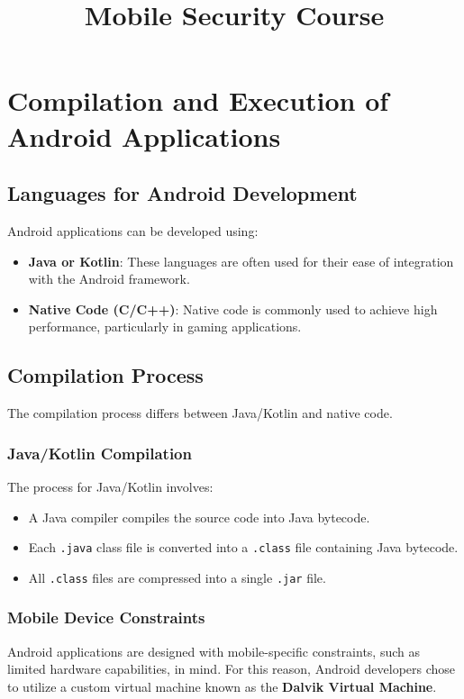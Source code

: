 \documentclass{article}
\title{Mobile Security Course}
\author{}
\date{}
\begin{document}
\maketitle

\section{Compilation and Execution of Android Applications}

\subsection{Languages for Android Development}
Android applications can be developed using:
\begin{itemize}
    \item \textbf{Java or Kotlin}: These languages are often used for their ease of integration with the Android framework.
    \item \textbf{Native Code (C/C++)}: Native code is commonly used to achieve high performance, particularly in gaming applications.
\end{itemize}

\subsection{Compilation Process}
The compilation process differs between Java/Kotlin and native code.

\subsubsection{Java/Kotlin Compilation}
The process for Java/Kotlin involves:
\begin{itemize}
    \item A Java compiler compiles the source code into Java bytecode.
    \item Each \texttt{.java} class file is converted into a \texttt{.class} file containing Java bytecode.
    \item All \texttt{.class} files are compressed into a single \texttt{.jar} file.
\end{itemize}

\subsubsection{Mobile Device Constraints}
Android applications are designed with mobile-specific constraints, such as limited hardware capabilities, in mind. For this reason, Android developers chose to utilize a custom virtual machine known as the \textbf{Dalvik Virtual Machine}.
\end{document}

